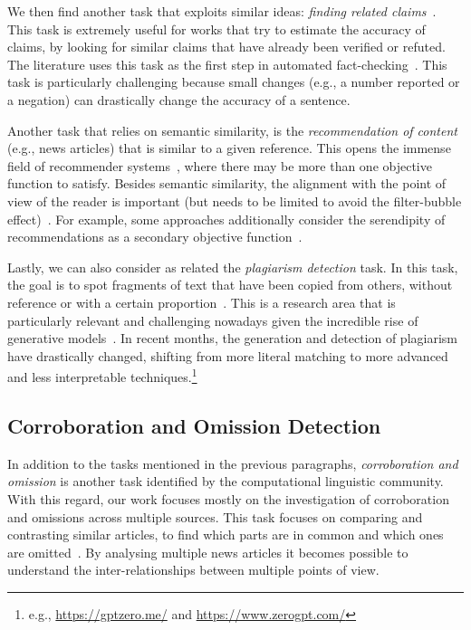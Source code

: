 We then find another task that exploits similar ideas: \emph{finding related claims}~\citep{almeida2020text}.
This task is extremely useful for works that try to estimate the accuracy of claims, by looking for similar claims that have already been verified or refuted.
The literature uses this task as the first step in automated fact-checking~\citep{nakov2021automated,guo2022survey}.
This task is particularly challenging because small changes (e.g., a number reported or a negation) can drastically change the accuracy of a sentence.


Another task that relies on semantic similarity, is the \emph{recommendation of content} (e.g., news articles) that is similar to a given reference.
This opens the immense field of recommender systems~\citep{tintarev2006similarity,karimi2018news,feng2020news}, where there may be more than one objective function to satisfy.
Besides semantic similarity, the alignment with the point of view of the reader is important (but needs to be limited to avoid the filter-bubble effect)~\citep{lunardi2020metric,nguyen2014exploring,lunardi2019representing}.
For example, some approaches additionally consider the serendipity of recommendations as a secondary objective function~\citep{ziarani2021serendipity,abdollahpouri2021toward,raza2022news}.

Lastly, we can also consider as related the \emph{plagiarism detection} task.
In this task, the goal is to spot fragments of text that have been copied from others, without reference or with a certain proportion~\citep{stein2006near,alzahrani2010fuzzy,arabi2022improving}.
This is a research area that is particularly relevant and challenging nowadays given the incredible rise of generative models~\citep{openai2023gpt4}.
In recent months, the generation and detection of plagiarism have drastically changed, shifting from more literal matching to more advanced and less interpretable techniques.\footnote{e.g., \url{https://gptzero.me/} and \url{https://www.zerogpt.com/}}


\subsection{\statusgreen Corroboration and Omission Detection}
\label{ssec:lit_relationships_corr_omiss}

In addition to the tasks mentioned in the previous paragraphs,
\textit{corroboration and omission}
is another task identified by the computational linguistic community.
With this regard, our work focuses mostly on the investigation of corroboration and omissions
across multiple sources.
This task focuses on comparing and contrasting similar articles, to find which parts are in common and which ones are omitted~\citep{ehrhardt2021omission,bountouridis2018explaining,ko2023claimdiff}.
By analysing multiple news articles it becomes possible to understand the inter-relationships between multiple points of view.

